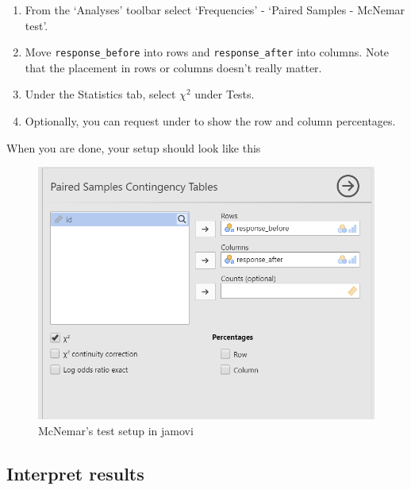 \documentclass[
]{book}
\begin{document}
\begin{enumerate}
\def\labelenumi{\arabic{enumi}.}
\item
  From the `Analyses' toolbar select `Frequencies' - `Paired Samples - McNemar test'.
\item
  Move \texttt{response\_before} into rows and \texttt{response\_after} into columns. Note that the placement in rows or columns doesn't really matter.
\item
  Under the Statistics tab, select \(\chi^2\) under Tests.
\item
  Optionally, you can request under to show the row and column percentages.
\end{enumerate}

When you are done, your setup should look like this

\begin{figure}

{\centering \includegraphics[width=0.8\linewidth]{images/12-mcnemar/mcnemar_setup} 

}

\caption{McNemar's test setup in jamovi}\label{fig:unnamed-chunk-1}
\end{figure}

\hypertarget{interpret-results-3}{%
\subsection{Interpret results}\label{interpret-results-3}}
\end{document}
